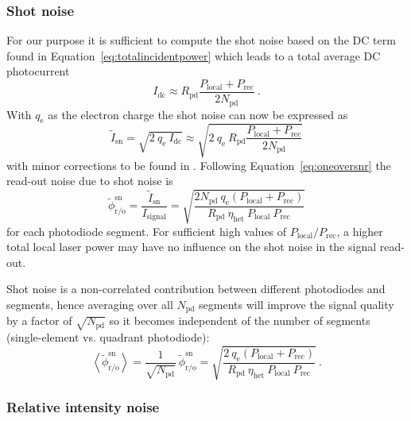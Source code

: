 \documentclass[fleqn,10pt]{<approot>/designer/latexelements/SelfArx} %
\begin{document}
\subsubsection{Shot noise}\label{sec:shotnoise}

For our purpose it is sufficient to compute the shot noise based on the DC term found in Equation~\ref{eq:totalincidentpower} which leads to a total average DC photocurrent
\begin{equation}
I_\text{dc} \approx R_\text{pd}\frac{P_\text{local}+P_\text{rec}}{2N_\text{pd}} ~.
\label{eq:totalincidentdc}
\end{equation}
With $q_\text{e}$ as the electron charge the shot noise can now be expressed as
\begin{equation}
\widetilde{I}_\text{sn} = \sqrt{2\: q_\text{e}\: I_\text{dc}} \approx \sqrt{2\:q_\text{e}\:R_\text{pd}\frac{P_\text{local}+P_\text{rec}}{2N_\text{pd}}}
\label{eq:shotnoise}
\end{equation}
with minor corrections to be found in \cite{meers1991modulation, niebauer1991nonstationary}.
Following Equation~\ref{eq:oneoversnr} the read-out noise due to shot noise is
\begin{equation}
\widetilde{\phi}_\text{r/o}^\text{sn}  = \frac{\widetilde{I}_\text{sn}}{I_\text{signal}} = \sqrt{\frac{2N_\text{pd} \: q_\text{e} \left(P_\text{local}+P_\text{rec}\right)}{R_\text{pd}\: \eta_\text{het}\: P_\text{local}\: P_\text{rec}}}
\label{eq:readoutshotnoise}
\end{equation} 
for each photodiode segment. For sufficient high values of $P_\text{local}/P_\text{rec}$, a higher total local laser power may have no influence on the shot noise in the signal read-out. 

Shot noise is a non-correlated contribution between different photodiodes and segments, hence averaging over all $N_\text{pd}$ segments will improve the signal quality by a factor of $\sqrt{N_\text{pd}}$ so it becomes independent of the number of segments (single-element vs. quadrant photodiode):
\begin{equation}
\left<\widetilde{\phi}_\text{r/o}^\text{sn}\right>  = \frac{1}{\sqrt{N_\text{pd}}}\: \widetilde{\phi}_\text{r/o}^\text{sn} = \sqrt{\frac{2 \: q_\text{e} \left(P_\text{local}+P_\text{rec}\right)}{R_\text{pd}\: \eta_\text{het}\: P_\text{local}\: P_\text{rec}}} ~ .
\label{eq:meanreadoutshotnoise}
\end{equation}


\subsubsection{Relative intensity noise}
\end{document}
